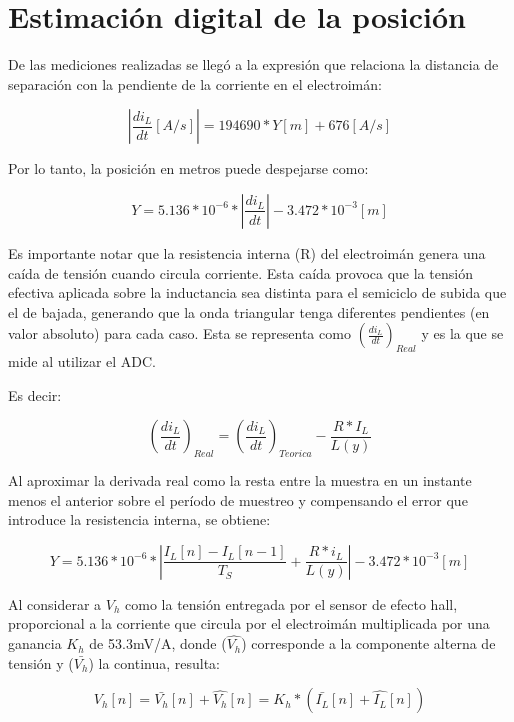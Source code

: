 \section{Estimación digital de la posición}

\noindent De las mediciones realizadas se llegó a la expresión que relaciona la distancia de separación con la pendiente de la corriente en el electroimán:

\begin{equation} 
	|\frac{di_L}{dt}[A/s]| = 194690 * Y[m] + 676 [A/s]
\end{equation}

\noindent Por lo tanto, la posición en metros puede despejarse como:

\begin{equation} 
	Y = 5.136*10^{-6}*|\frac{di_L}{dt}|- 3.472*10^{-3} [m]
\end{equation}

\noindent Es importante notar que la resistencia interna (R) del electroimán genera una caída de tensión cuando circula corriente. Esta caída provoca que la tensión efectiva aplicada sobre la inductancia sea distinta para el semiciclo de subida que el de bajada, generando que la onda triangular tenga diferentes pendientes (en valor absoluto) para cada caso. Esta se representa como $(\frac{di_L}{dt})_{Real}$ y es la que se mide al utilizar el ADC.

\noindent Es decir:

\begin{equation} 
	(\frac{di_L}{dt})_{Real}=(\frac{di_L}{dt})_{Teorica}-\frac{R*I_L}{L(y)}
\end{equation}

\noindent Al aproximar la derivada real como la resta entre la muestra en un instante menos el anterior sobre el período de muestreo y compensando el error que introduce la resistencia interna, se obtiene:

\begin{equation} 
	Y = 5.136*10^{-6}* |\frac{I_L[n]-I_L[n-1]}{T_S}+\frac{R*i_L}{L(y)}| - 3.472*10^{-3} [m]
\end{equation}


\noindent Al considerar a $V_h$ como la tensión entregada por el sensor de efecto hall, proporcional a la corriente que circula por el electroimán multiplicada por una ganancia $K_h$ de 53.3mV/A, donde  ($\hat{V_h}$)  corresponde a la componente alterna de tensión y ($\bar{V_h}$) la continua, resulta:


\begin{equation} 
	V_h[n] = \bar{V_h}[n] + \hat{V_h}[n] = K_h * (\bar{I_L}[n] + \hat{I_L}[n])
\end{equation}

